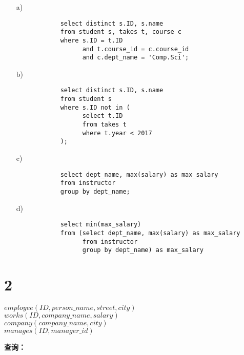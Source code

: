 \documentclass{article}
\begin{document}
	\begin{enumerate}[noitemsep, label={{\arabic*})}]
		\item[a)] 
		
		\begin{verbatim}
			select distinct s.ID, s.name
			from student s, takes t, course c
			where s.ID = t.ID
			      and t.course_id = c.course_id
			      and c.dept_name = 'Comp.Sci';
		\end{verbatim}
		
		\item[b)]
		
		\begin{verbatim}
			select distinct s.ID, s.name
			from student s
			where s.ID not in (
			      select t.ID
			      from takes t
			      where t.year < 2017
			);
		\end{verbatim}
		
		\item[c)]
		
		\begin{verbatim}
			select dept_name, max(salary) as max_salary
			from instructor
			group by dept_name;
		\end{verbatim}
		
		\item[d)] 
		
		\begin{verbatim}
			select min(max_salary)
			from (select dept_name, max(salary) as max_salary
			      from instructor
			      group by dept_name) as max_salary
		\end{verbatim}
	\end{enumerate}\textbf{}
	
	\section*{2}
	
	\noindent
	
	\begin{tcolorbox}[title = {雇员数据库}, colback = blue!25!white, colframe = blue!75!black]
		$employee(ID, person\_name, street, city)$ \\
		$works(ID, company\_name, salary)$ \\
		$company(company\_name, city)$ \\
		$manages(ID, manager\_id)$
	\end{tcolorbox}
	
	\noindent
	
	\textbf{查询：}
	
\end{document}
